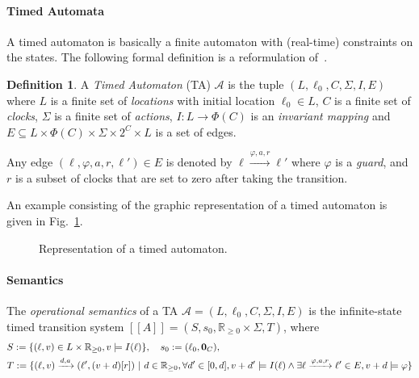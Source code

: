 \documentclass[11pt]{article}
\theoremstyle{definition}
\newtheorem{definition}{Definition}
\theoremstyle{remark}
\theoremstyle{definition}
\begin{document}

\paragraph{Timed Automata}\label{par:ta}
A timed automaton is basically a finite automaton with (real-time) constraints on the states.
The following formal definition is a reformulation of~\cite[Chapter 29.2, Definition 1]{handbook}.
\begin{definition}\label{def:ta}
	A \emph{Timed Automaton} (TA) $\mathcal{A}$ is the tuple $(L, \ell_0, C, \Sigma, I, E)$ where
	$L$ is a finite set of \emph{locations} with initial location $\ell_0 \in L$,
	$C$ is a finite set of \emph{clocks},
	$\Sigma$ is a finite set of \emph{actions},
	$I \colon L \to \Phi(C)$ is an \emph{invariant mapping} and
	$E \subseteq L \times \Phi(C) \times \Sigma \times 2^{C} \times L$ is a set of edges.

	Any edge $(\ell, \varphi, a, r, \ell') \in E$ is denoted by $\ell \xrightarrow{\varphi, a, r} \ell'$ where $\varphi$ is a \emph{guard}, and $r$ is a subset of clocks that are set to zero after taking the transition.
\end{definition}
An example consisting of the graphic representation of a timed automaton is given in Fig.~\ref{fig:ta_ex}.

\begin{figure}[ht]
\centering
{}
\caption{Representation of a timed automaton.}\label{fig:ta_ex}
\end{figure}

\paragraph{Semantics}\label{par:semantics}
The \emph{operational semantics} of a TA $\mathcal{A} = (L, \ell_0, C, \Sigma, I, E)$ is the infinite-state timed transition system $[\![A]\!] = (S, s_0, \mathbb{R}_{\geq 0} \times \Sigma, T)$, where
\begin{align*}
	&S := \{(\ell, v) \in L \times \mathbb{R}_{\geq 0}, v \models I(\ell)\}, \quad s_0 := (\ell_0, \text{\bf 0}_C),\\
	&T := \{(\ell, v) \xrightarrow{d, a} (\ell', (v+d)[r]) \ | \ d \in \mathbb{R}_{\geq 0}, \forall d' \in [0, d], v + d' \models I(\ell) \land \exists \ell \xrightarrow{\varphi, a, r} \ell' \in E, v + d \models \varphi \}
\end{align*}
\end{document}
